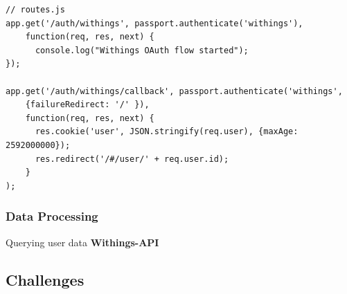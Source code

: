 \documentclass[../medieninformatik-arbeit.tex]{subfiles}
\begin{document}
\begin{lstlisting}[style=htmlcssjs, caption={Passport OAuth authentication implementation},label=list:auth]
// routes.js
app.get('/auth/withings', passport.authenticate('withings'),
    function(req, res, next) {
      console.log("Withings OAuth flow started");
});

app.get('/auth/withings/callback', passport.authenticate('withings',
	{failureRedirect: '/' }),
	function(req, res, next) {
	  res.cookie('user', JSON.stringify(req.user), {maxAge: 2592000000});
	  res.redirect('/#/user/' + req.user.id);
	}
);
\end{lstlisting}


\subsubsection{Data Processing}





Querying user data
\textbf{Withings-API}\cite{withingsApi} 


\subsection{Challenges}
\end{document}

